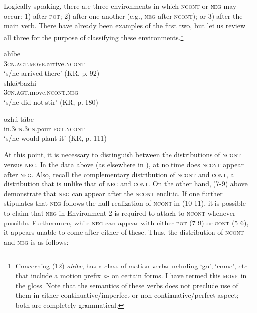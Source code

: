 \documentclass[output=paper]{LSP/langsci}
\begin{document}
Logically speaking, there are three environments in which \textsc{ncont} or \textsc{neg} may occur: 1) after \textsc{pot}; 2) after one another (e.g., \textsc{neg} after \textsc{ncont}); or 3) after the main verb. There have already been examples of the first two, but let us review all three for the purpose of classifying these environments.\footnote{Concerning (12) \textit{ahíbe},  has a class of motion verbs including `go', `come', etc. that include a motion prefix \textit{a-} on certain forms. I have termed this \textsc{move} in the gloss. Note that the semantics of these verbs does not preclude use of them in either continuative/imperfect or non-continuative/perfect aspect; both are completely grammatical.}

\ea
  \ea 
 
  \gll ahíbe  \\
  \textsc{3cn.agt.move}.arrive.\textsc{ncont}  \\
  \glt `s/he arrived there' (KR, p. 92)   \\

  \ex 
  \gll shkáⁿbazhi   ~\,\, \\
  \textsc{3cn.agt}.move.\textsc{ncont.neg}   \\
  \glt `s/he did not stir' (KR, p. 180)    

  \ex
  \gll ozhú	tábe	  \\
  in.\textsc{3cn.3cn}.pour \textsc{pot.ncont}\,   \\
  \glt `s/he would plant it' (KR, p. 111)    
  \z 
\z 

\vspace{1em}
At this point, it is necessary to distinguish between the distributions of \textsc{ncont} versus \textsc{neg}. In the data above (as elsewhere in ), at no time does \textsc{ncont} appear after \textsc{neg}. Also, recall the complementary distribution of \textsc{ncont} and \textsc{cont}, a distribution that is unlike that of \textsc{neg} and \textsc{cont}. On the other hand, (7-9) above demonstrate that \textsc{neg} can appear after the \textsc{ncont} enclitic. If one further stipulates that \textsc{neg} follows the null realization of \textsc{ncont} in (10-11), it is possible to claim that \textsc{neg} in Environment 2 is required to attach to \textsc{ncont} whenever possible. Furthermore, while \textsc{neg} can appear with either \textsc{pot} (7-9) or \textsc{cont} (5-6), it appears unable to come after either of these. Thus, the distribution of \textsc{ncont} and \textsc{neg} is as follows:
\end{document}
